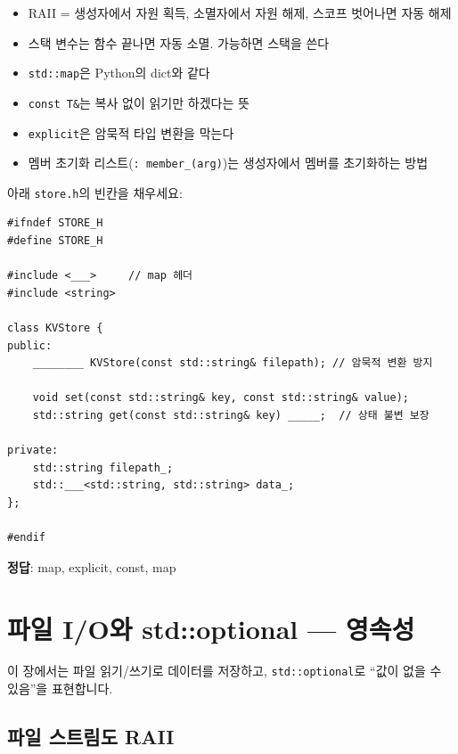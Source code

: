 \documentclass[11pt,a4paper]{book}
\newcommand{\file}[1]{\texttt{#1}}
\newcommand{\code}[1]{\texttt{#1}}
\begin{document}
\begin{summarybox}
\begin{itemize}[nosep]
\item RAII = 생성자에서 자원 획득, 소멸자에서 자원 해제, 스코프 벗어나면 자동 해제
\item 스택 변수는 함수 끝나면 자동 소멸. 가능하면 스택을 쓴다
\item \code{std::map}은 Python의 dict와 같다
\item \code{const T\&}는 복사 없이 읽기만 하겠다는 뜻
\item \code{explicit}은 암묵적 타입 변환을 막는다
\item 멤버 초기화 리스트(\code{: member\_(arg)})는 생성자에서 멤버를 초기화하는 방법
\end{itemize}
\end{summarybox}

\begin{quizbox}
아래 \file{store.h}의 빈칸을 채우세요:

\begin{lstlisting}[style=cpp,numbers=none]
#ifndef STORE_H
#define STORE_H

#include <___>     // map 헤더
#include <string>

class KVStore {
public:
    ________ KVStore(const std::string& filepath); // 암묵적 변환 방지

    void set(const std::string& key, const std::string& value);
    std::string get(const std::string& key) _____;  // 상태 불변 보장

private:
    std::string filepath_;
    std::___<std::string, std::string> data_;
};

#endif
\end{lstlisting}

\textbf{정답}: map, explicit, const, map
\end{quizbox}

\chapter{파일 I/O와 std::optional — 영속성}
\label{ch:fileio}

이 장에서는 파일 읽기/쓰기로 데이터를 저장하고, \code{std::optional}로 ``값이 없을 수 있음''을 표현합니다.

\section{파일 스트림도 RAII}
\end{document}
